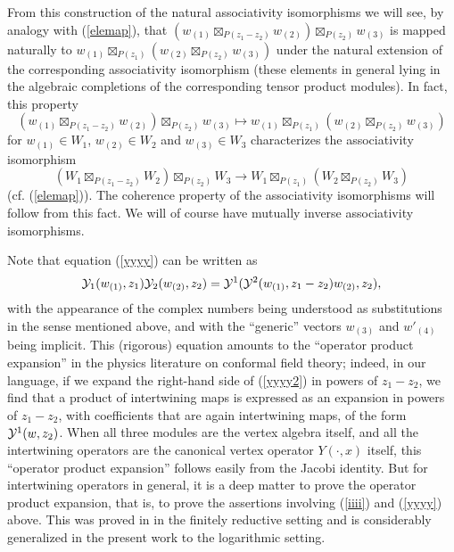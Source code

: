 \documentclass[12pt]{article}
\begin{document}
{}From this construction of the natural associativity isomorphisms we
will see, by analogy with (\ref{elemap}), that
$(w_{(1)}\boxtimes_{P(z_1-z_2)} w_{(2)})\boxtimes_{P(z_2)} w_{(3)}$ is
mapped naturally to $w_{(1)}\boxtimes_{P(z_1)}
(w_{(2)}\boxtimes_{P(z_2)} w_{(3)})$ under the natural extension of
the corresponding associativity isomorphism (these elements in general
lying in the algebraic completions of the corresponding tensor product
modules). In fact, this property
\begin{equation}
(w_{(1)}\boxtimes_{P(z_1-z_2)} w_{(2)})\boxtimes_{P(z_2)} w_{(3)}
\mapsto
w_{(1)}\boxtimes_{P(z_1)}
(w_{(2)}\boxtimes_{P(z_2)} w_{(3)})
\end{equation}
for $w_{(1)}\in W_{1}$, $w_{(2)}\in W_{2}$ and $w_{(3)}\in W_{3}$
characterizes
the associativity isomorphism
\begin{equation}
(W_{1}\boxtimes_{P(z_1-z_2)} W_{2})\boxtimes_{P(z_2)} W_{3}\to
W_{1}\boxtimes_{P(z_1)}
(W_{2}\boxtimes_{P(z_2)} W_{3})
\end{equation}
(cf. (\ref{elemap})).  The coherence property of the associativity
isomorphisms will follow {}from this fact.  We will of course have
mutually inverse associativity isomorphisms.

\begin{rema}{\rm
Note that equation (\ref{yyyy}) can be written as
\begin{equation}\label{yyyy2}
{\cal Y}_1(w_{(1)}, z_1){\cal Y}_2(w_{(2)},z_2)=
{\cal Y}^1({\cal Y}^2(w_{(1)}, z_1-z_2)w_{(2)},
z_2),
\end{equation}
with the appearance of the complex numbers being understood as
substitutions in the sense mentioned above, and with the ``generic''
vectors $w_{(3)}$ and $w'_{(4)}$ being implicit.  This (rigorous)
equation amounts to the ``operator product expansion'' in the physics
literature on conformal field theory; indeed, in our language, if we
expand the right-hand side of (\ref{yyyy2}) in powers of $z_1-z_2$, we
find that a product of intertwining maps is expressed as an expansion
in powers of $z_1-z_2$, with coefficients that are again intertwining
maps, of the form ${\cal Y}^1(w,z_2)$.  When all three modules are the
vertex algebra itself, and all the intertwining operators are the
canonical vertex operator $Y(\cdot,x)$ itself, this ``operator product
expansion'' follows easily {}from the Jacobi identity.  But for
intertwining operators in general, it is a deep matter to prove the
operator product expansion, that is, to prove the assertions involving
(\ref{iiii}) and (\ref{yyyy}) above.  This was proved in
\cite{tensor4} in the finitely reductive setting and is considerably
generalized in the present work to the logarithmic setting.}
\end{rema}
\end{document}
